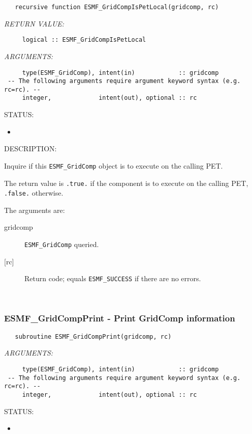   
\begin{verbatim}   recursive function ESMF_GridCompIsPetLocal(gridcomp, rc)\end{verbatim}{\em RETURN VALUE:}
\begin{verbatim}     logical :: ESMF_GridCompIsPetLocal\end{verbatim}{\em ARGUMENTS:}
\begin{verbatim}     type(ESMF_GridComp), intent(in)            :: gridcomp
 -- The following arguments require argument keyword syntax (e.g. rc=rc). --
     integer,             intent(out), optional :: rc\end{verbatim}
{\sf STATUS:}
   \begin{itemize}
   \item{}
   \end{itemize}
  
{\sf DESCRIPTION:\\ }


   Inquire if this {\tt ESMF\_GridComp} object is to execute on the calling PET.
  
   The return value is {\tt .true.} if the component is to execute on the
   calling PET, {\tt .false.} otherwise.
  
   The arguments are:
   \begin{description}
   \item[gridcomp]
     {\tt ESMF\_GridComp} queried.
   \item[{[rc]}]
     Return code; equals {\tt ESMF\_SUCCESS} if there are no errors.
   \end{description}
   
 
\mbox{}\hrulefill\ 
 
\subsubsection [ESMF\_GridCompPrint] {ESMF\_GridCompPrint - Print GridComp information}


  
\begin{verbatim}   subroutine ESMF_GridCompPrint(gridcomp, rc)\end{verbatim}{\em ARGUMENTS:}
\begin{verbatim}     type(ESMF_GridComp), intent(in)            :: gridcomp
 -- The following arguments require argument keyword syntax (e.g. rc=rc). --
     integer,             intent(out), optional :: rc\end{verbatim}
{\sf STATUS:}
   \begin{itemize}
   \item{}
   \end{itemize}
  
